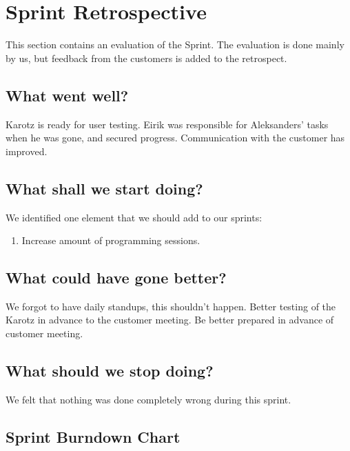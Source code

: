\section{Sprint Retrospective}
\label{sec:sprint3sprintRetrospective}
This section contains an evaluation of the Sprint. The evaluation is done mainly by us, but feedback from the customers is added to the retrospect.

\subsection*{What went well?}
Karotz is ready for user testing. 
Eirik was responsible for Aleksanders' tasks when he was gone, and secured progress.
Communication with the customer has improved.

\subsection*{What shall we start doing?}
We identified one element that we should add to our sprints:
\begin{enumerate}
	\item Increase amount of programming sessions. %
\end{enumerate}

\subsection*{What could have gone better?}
We forgot to have daily standups, this shouldn't happen.
Better testing of the Karotz in advance to the customer meeting.
Be better prepared in advance of customer meeting.


\subsection*{What should we stop doing?}
We felt that nothing was done completely wrong during this sprint.

\subsection{Sprint Burndown Chart}

